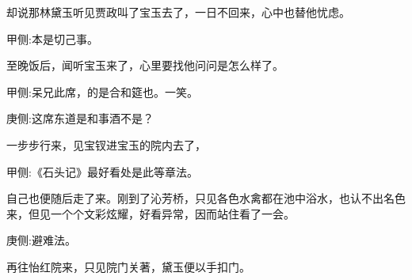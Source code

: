 \begin{parag}
    却说那林黛玉听见贾政叫了宝玉去了，一日不回来，心中也替他忧虑。\begin{note}甲侧:本是切己事。\end{note}至晚饭后，闻听宝玉来了，心里要找他问问是怎么样了。\begin{note}甲侧:呆兄此席，的是合和筵也。一笑。\end{note}\begin{note}庚侧:这席东道是和事酒不是？\end{note}一步步行来，见宝钗进宝玉的院内去了，\begin{note}甲侧:《石头记》最好看处是此等章法。\end{note}自己也便随后走了来。刚到了沁芳桥，只见各色水禽都在池中浴水，也认不出名色来，但见一个个文彩炫耀，好看异常，因而站住看了一会。\begin{note}庚侧:避难法。\end{note}再往怡红院来，只见院门关著，黛玉便以手扣门。
\end{parag}


